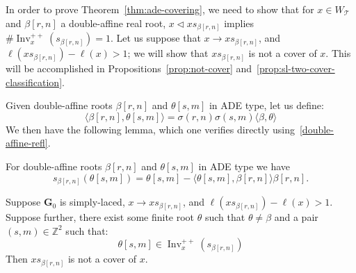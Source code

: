 \documentclass[ALCO,ThmDefs,Unicode]{cedram}
\DeclareMathOperator{\Inv}{Inv}
\newcommand{\bG}{\mathbf{G}}
\newcommand{\cT}{\mathcal{T}}
\newcommand{\ZZ}{\mathbb{Z}}
\newcommand{\WTits}{W_{\TitsCone}}
\newcommand{\TitsCone}{\cT}
\newcommand{\Invplusplusx}{\Inv^{++}_x}
\begin{document}
In order to prove Theorem~\ref{thm:ade-covering}, we need to show that for $x \in \WTits$ and $\beta[r,n]$ a double-affine real root, $x \lhd x s_{\beta[r,n]}$ implies $\# \Invplusplusx(s_{\beta[r,n]}) = 1$. Let us suppose that $x \rightarrow x s_{\beta[r,n]}$, and $\ell(x s_{\beta[r,n]}) - \ell(x) > 1$; we will show that $x s_{\beta[r,n]}$ is not a cover of $x$. This will be accomplished in Propositions~\ref{prop:not-cover} and~\ref{prop:sl-two-cover-classification}.

Given double-affine roots $\beta[r,n]$ and $\theta[s,m]$ in ADE type, let us define:
\begin{equation}\label{eq:31}
\langle \beta[r,n], \theta[s,m] \rangle = \sigma(r,n)\sigma(s,m) \langle \beta, \theta \rangle
\end{equation}
We then have the following lemma, which one verifies directly using~\eqref{double-affine-refl}.
\begin{lemm}\label{lem:reflection-formula-with-pairing}
For double-affine roots $\beta[r,n]$ and $\theta[s,m]$ in ADE type we have
\begin{equation}\label{eq:32}
s_{\beta[r,n]}(\theta[s,m]) = \theta[s,m] - \langle \theta[s,m], \beta[r,n] \rangle \beta[r,n].
\end{equation}
\end{lemm}

\begin{prop}\label{prop:not-cover}
Suppose $\bG_0$ is simply-laced, $x \rightarrow x s_{\beta[r,n]}$, and $\ell(x s_{\beta[r,n]}) - \ell(x) > 1$. Suppose further, there exist some finite root $\theta$ such that $\theta \neq \beta$ and a pair $(s,m) \in \ZZ^2$ such that:
\begin{equation}\label{eq:8}
\theta[s,m] \in \Invplusplusx(s_{\beta[r,n]})
\end{equation}
Then $x s_{\beta[r,n]}$ is not a cover of $x$.
\end{prop}
\end{document}
